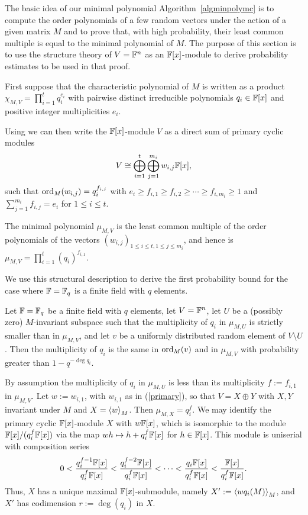 The basic idea of our minimal polynomial Algorithm~\ref{algminpolymc}
is to compute the order polynomials of a few
random vectors under the action of a given matrix $M$ and to prove that, 
with high probability, their least common multiple is
equal to the minimal polynomial of $M$.
The purpose of this section is to use the structure theory 
of $V = \mathbb{F}^n$ as an $\mathbb{F}[x]$-module to derive probability
estimates to be used in that proof.

First suppose that the characteristic polynomial of $M$ is written as a product
$\chi_{M,V} = \prod_{i=1}^t q_i^{e_i}$ with pairwise distinct
irreducible polynomials $q_i \in \mathbb{F}[x]$ and positive integer
multiplicities $e_i$.

Using \cite[Theorem 3.12]{Jacob1} we can then write the $\mathbb{F}[x]$-module $V$
as a direct sum of primary cyclic modules
\begin{equation} \label{primary}
V \cong \bigoplus_{i=1}^t \bigoplus_{j=1}^{m_i} w_{i,j} \F[x], 
\end{equation}
such that $\mathrm{ord}_M(w_{i,j}) = q_i^{f_{i,j}}$ with
$e_i \ge f_{i,1} \ge f_{i,2} \ge \cdots \ge f_{i,m_i} \ge 1$
and $\sum_{j=1}^{m_i} f_{i,j}=e_i$ for $1 \le i \le t$.

The minimal polynomial $\mu_{M,V}$ is the least
common multiple of the order polynomials of the vectors 
$(w_{i,j})_{1 \le i \le t, 1 \le j \le m_i}$, and hence is 
$\mu_{M,V} = \prod_{i=1}^t (q_i)^{f_{i,1}}$.

We use this structural description to derive the
first probability bound for the case where $\mathbb{F} = \mathbb{F}_q$ is a finite field
with $q$ elements.

\begin{Prop}
\label{ProbOneMult}

Let\/ $\mathbb{F} = \mathbb{F}_q$ be a finite field with $q$ elements, let $V=\mathbb{F}^n$, let
$U$ be a (possibly zero) $M$-invariant subspace such that the multiplicity of
$q_i$ in $\mu_{M,U}$ is strictly smaller than in $\mu_{M,V}$, and let 
$v$ be a uniformly distributed random element of\/ $V\setminus U$. Then 
the multiplicity of $q_i$ is the same in\/ $\mathrm{ord}_M(v)$ and in $\mu_{M,V}$ 
with probability greater than
$1-q^{-\deg q_i}$.
\end{Prop}
\proofbeg
By assumption the multiplicity of $q_i$ in $\mu_{M,U}$ 
is less than its multiplicity $f:=f_{i,1}$ in $\mu_{M,V}$. 
Let $w:=w_{i,1}$, with $w_{i,1}$ as in (\ref{primary}), so that $V=X\oplus Y$ with
$X, Y$ invariant under $M$ and $X=\left< w\right>_M$. Then $\mu_{M,X}=
q_i^{f}$. We may identify the primary cyclic $\mathbb{F}[x]$-module 
$X$ with  $w\mathbb{F}[x]$, which is
isomorphic to the module $\mathbb{F}[x]/(q_i^{f}\mathbb{F}[x])$ via the map
$w h \mapsto h + q_i^{f} \mathbb{F}[x]$ for $h \in \mathbb{F}[x]$.
This module is uniserial with composition series
\[ 
0 <   \frac{q_i^{f-1}\mathbb{F}[x]}{q_i^{f}\mathbb{F}[x]}
     <   \frac{q_i^{f-2}\mathbb{F}[x]}{q_i^{f}\mathbb{F}[x]} <
\cdots <  \frac{q_i\mathbb{F}[x]}{q_i^{f}\mathbb{F}[x]} 
       < \frac{\mathbb{F}[x]}{q_i^{f}\mathbb{F}[x]}. 
\]
Thus, $X$ has a unique maximal $\mathbb{F}[x]$-submodule, namely  $X':=\left< w q_i(M)\right>_M$,
and $X'$ has codimension $r:=\deg(q_i)$ in $X$. 


